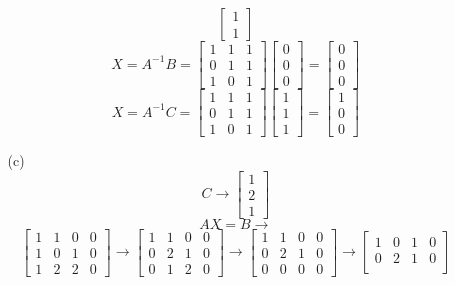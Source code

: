 \documentclass[12pt]{article}
\begin{document}
\begin{itemize}
\begin{itemize}
$$\begin{bmatrix}
1 \\
1
\end{bmatrix}$$
$$X = A^{-1}B = \begin{bmatrix}
1 & 1 & 1 \\
0 & 1 & 1 \\
1 & 0 & 1
\end{bmatrix}\begin{bmatrix}
0 \\
0 \\
0
\end{bmatrix} = \begin{bmatrix}
0 \\
0 \\
0
\end{bmatrix}$$
$$X = A^{-1}C = \begin{bmatrix}
1 & 1 & 1 \\
0 & 1 & 1 \\
1 & 0 & 1
\end{bmatrix}\begin{bmatrix}
1 \\
1 \\
1
\end{bmatrix} = \begin{bmatrix}
1 \\
0 \\
0
\end{bmatrix}$$
\item[(c)]
$$C \rightarrow \begin{bmatrix}
1 \\
2 \\
1
\end{bmatrix}$$
$$AX = B \rightarrow$$
$$\begin{bmatrix}
1 & 1 & 0 & 0 \\
1 & 0 & 1 & 0 \\
1 & 2 & 2 & 0
\end{bmatrix} \rightarrow \begin{bmatrix}
1 & 1 & 0 & 0 \\
0 & 2 & 1 & 0 \\
0 & 1 & 2 & 0
\end{bmatrix} \rightarrow \begin{bmatrix}
1 & 1 & 0 & 0 \\
0 & 2 & 1 & 0 \\
0 & 0 & 0 & 0
\end{bmatrix} \rightarrow \begin{bmatrix}
1 & 0 & 1& 0 \\
0 & 2 & 1 & 0 \\

\end{bmatrix}$$
\end{itemize}
\end{itemize}
\end{document}
